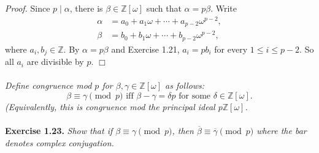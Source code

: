 \documentclass{article}
\begin{document}
\emph{Proof.}
Since $p \mid \alpha$, there is $\beta \in \mathbb{Z}[\omega]$
such that $\alpha = p\beta$.
Write
\begin{align*}
\alpha &= a_0 + a_1 \omega + \cdots + a_{p-2} \omega^{p-2}, \\
\beta &= b_0 + b_1 \omega + \cdots + b_{p-2} \omega^{p-2},
\end{align*}
where $a_i, b_j \in \mathbb{Z}$.
By $\alpha = p\beta$ and Exercise 1.21, $a_i = pb_i$ for every $1 \leq i \leq p-2$.
So all $a_i$ are divisible by $p$.
$\Box$ \\\\






\emph{Define congruence mod $p$ for $\beta, \gamma \in \mathbb{Z}[\omega]$
as follows:
$$\beta \equiv \gamma \pmod{p}
\text{ iff }
\beta - \gamma = \delta p \text{ for some } \delta \in \mathbb{Z}[\omega].$$
(Equivalently, this is congruence mod the principal ideal $p\mathbb{Z}[\omega]$.} \\\\



\textbf{Exercise 1.23.}
\emph{Show that if $\beta \equiv \gamma \pmod{p}$,
then $\overline{\beta} \equiv \overline{\gamma} \pmod{p}$
where the bar denotes complex conjugation. } \\
\end{document}
